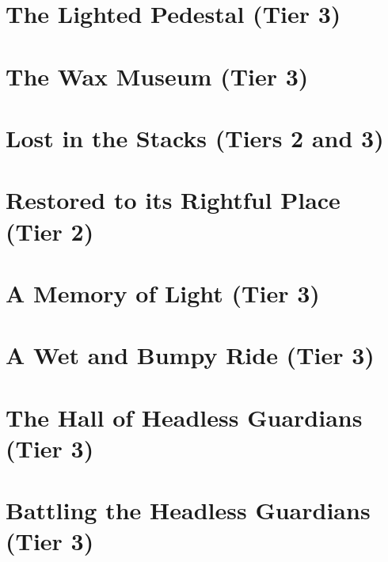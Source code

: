 \documentclass[sheet]{GL2020}
\begin{document}
\clearpage

\section*{The Lighted Pedestal (Tier 3)}
\label{LightedPedestal}

\clearpage

\section*{The Wax Museum (Tier 3)}
\label{WaxMuseum}

\clearpage

\section*{Lost in the Stacks (Tiers 2 and 3)}
\label{LostintheStacks}

\clearpage

\section*{Restored to its Rightful Place (Tier 2)}
\label{RestoredRightfulPlace}

\clearpage

\section*{A Memory of Light (Tier 3)}
\label{MemoryofLight}

\clearpage

\section*{A Wet and Bumpy Ride (Tier 3)}
\label{WetandBumpyRide}

\clearpage

\section*{The Hall of Headless Guardians (Tier 3)}
\label{HallofHeadlessGuardians}

\clearpage

\section*{Battling the Headless Guardians (Tier 3)}
\label{HallofHeadlessGuardians}

\clearpage
\end{document}
